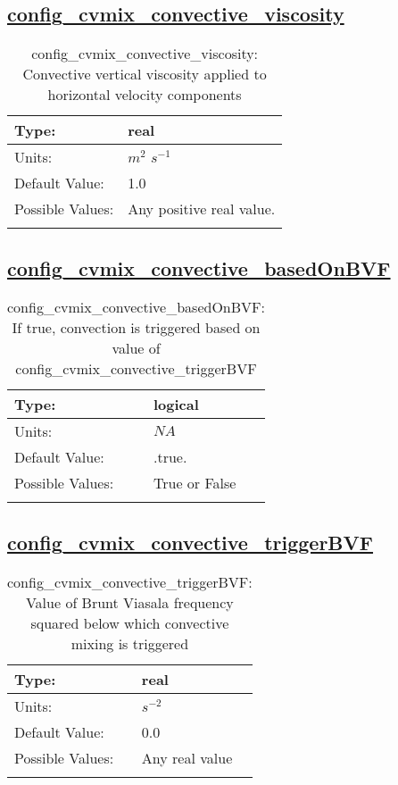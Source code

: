 \subsection[config\_cvmix\_convective\_viscosity]{\hyperref[sec:nm_tab_cvmix]{config\_cvmix\_convective\_viscosity}}
\label{subsec:nm_sec_config_cvmix_convective_viscosity}
\begin{center}
\begin{longtable}{| p{2.0in} || p{4.0in} |}
    \hline
    Type: & real \\
    \hline
    Units: & $m^2$ $s^{-1}$ \\
    \hline
    Default Value: & 1.0 \\
    \hline
    Possible Values: & Any positive real value. \\
    \hline
    \caption{config\_cvmix\_convective\_viscosity: Convective vertical viscosity applied to horizontal velocity components}
\end{longtable}
\end{center}
\subsection[config\_cvmix\_convective\_basedOnBVF]{\hyperref[sec:nm_tab_cvmix]{config\_cvmix\_convective\_basedOnBVF}}
\label{subsec:nm_sec_config_cvmix_convective_basedOnBVF}
\begin{center}
\begin{longtable}{| p{2.0in} || p{4.0in} |}
    \hline
    Type: & logical \\
    \hline
    Units: & $NA$ \\
    \hline
    Default Value: & .true. \\
    \hline
    Possible Values: & True or False \\
    \hline
    \caption{config\_cvmix\_convective\_basedOnBVF: If true, convection is triggered based on value of config\_cvmix\_convective\_triggerBVF}
\end{longtable}
\end{center}
\subsection[config\_cvmix\_convective\_triggerBVF]{\hyperref[sec:nm_tab_cvmix]{config\_cvmix\_convective\_triggerBVF}}
\label{subsec:nm_sec_config_cvmix_convective_triggerBVF}
\begin{center}
\begin{longtable}{| p{2.0in} || p{4.0in} |}
    \hline
    Type: & real \\
    \hline
    Units: & $s^{-2}$ \\
    \hline
    Default Value: & 0.0 \\
    \hline
    Possible Values: & Any real value \\
    \hline
    \caption{config\_cvmix\_convective\_triggerBVF: Value of Brunt Viasala frequency squared below which convective mixing is triggered}
\end{longtable}
\end{center}
